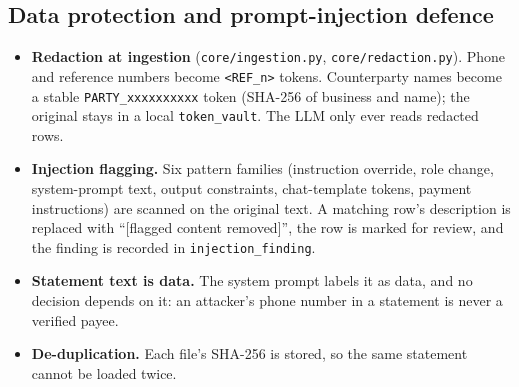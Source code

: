 \documentclass[10pt,a4paper]{article}
\newcommand{\code}[1]{\texttt{\small #1}}
\begin{document}
\subsection{Data protection and prompt-injection defence}
\begin{itemize}
  \item \textbf{Redaction at ingestion} (\code{core/ingestion.py}, \code{core/redaction.py}). Phone and reference numbers become \code{<REF\_n>} tokens. Counterparty names become a stable \code{PARTY\_xxxxxxxxxx} token (SHA-256 of business and name); the original stays in a local \code{token\_vault}. The LLM only ever reads redacted rows.
  \item \textbf{Injection flagging.} Six pattern families (instruction override, role change, system-prompt text, output constraints, chat-template tokens, payment instructions) are scanned on the original text. A matching row's description is replaced with ``[flagged content removed]'', the row is marked for review, and the finding is recorded in \code{injection\_finding}.
  \item \textbf{Statement text is data.} The system prompt labels it as data, and no decision depends on it: an attacker's phone number in a statement is never a verified payee.
  \item \textbf{De-duplication.} Each file's SHA-256 is stored, so the same statement cannot be loaded twice.
\end{itemize}
\end{document}

